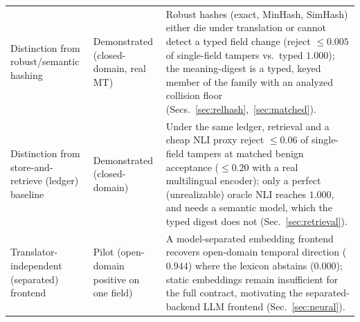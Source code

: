 \documentclass[journal]{IEEEtran}
\begin{document}
\begin{table}[t]
\begin{tabularx}{\textwidth}{@{}>{\raggedright\arraybackslash}p{3.1cm}>{\raggedright\arraybackslash}p{3.0cm}X@{}}
Distinction from robust/semantic hashing & Demonstrated (closed-domain, real MT) & Robust hashes (exact, MinHash, SimHash) either die under translation or cannot detect a typed field change (reject $\le0.005$ of single-field tampers vs.\ typed $1.000$); the meaning-digest is a typed, keyed member of the family with an analyzed collision floor (Secs.~\ref{sec:relhash},~\ref{sec:matched}). \\
Distinction from store-and-retrieve (ledger) baseline & Demonstrated (closed-domain) & Under the same ledger, retrieval and a cheap NLI proxy reject $\le0.06$ of single-field tampers at matched benign acceptance ($\le0.20$ with a real multilingual encoder); only a perfect (unrealizable) oracle NLI reaches $1.000$, and needs a semantic model, which the typed digest does not (Sec.~\ref{sec:retrieval}). \\
Translator-independent (separated) frontend & Pilot (open-domain positive on one field) & A model-separated embedding frontend recovers open-domain temporal direction ($0.944$) where the lexicon abstains ($0.000$); static embeddings remain insufficient for the full contract, motivating the separated-backend LLM frontend (Sec.~\ref{sec:neural}). \\
\bottomrule
\end{tabularx}
\end{table}
\end{document}
